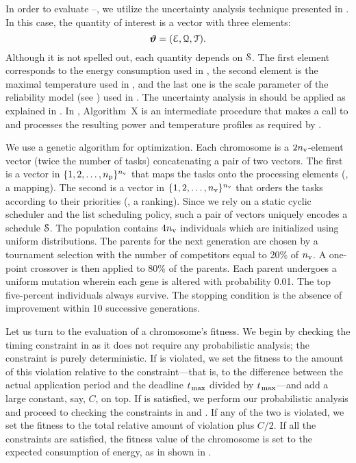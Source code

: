 In order to evaluate --, we utilize the uncertainty analysis technique presented in .
In this case, the quantity of interest is a vector with three elements:
\begin{equation} \elab{quantity-of-interest}
  \vw = (\qoiE, \qoiQ, \qoiT).
\end{equation}
Although it is not spelled out, each quantity depends on $\EuScript{S}$.
The first element corresponds to the energy consumption used in , the second element is the maximal temperature used in , and the last one is the scale parameter of the reliability model (see ) used in .
The uncertainty analysis in  should be applied as explained in .
In , Algorithm~X is an intermediate procedure that makes a call to  and processes the resulting power and temperature profiles as required by .

We use a genetic algorithm for optimization.
Each chromosome is a $2 {n_\text{v}}$-element vector (twice the number of tasks) concatenating a pair of two vectors.
The first is a vector in $\{ 1, 2, \dotsc, {n_\text{p}} \}^{n_\text{v}}$ that maps the tasks onto the processing elements (\ie, a mapping).
The second is a vector in $\{ 1, 2, \dotsc, {n_\text{v}} \}^{n_\text{v}}$ that orders the tasks according to their priorities (\ie, a ranking).
Since we rely on a static cyclic scheduler and the list scheduling policy, such a pair of vectors uniquely encodes a schedule $\EuScript{S}$.
The population contains $4 {n_\text{v}}$ individuals which are initialized using uniform distributions.
The parents for the next generation are chosen by a tournament selection with the number of competitors equal to 20\% of ${n_\text{v}}$.
A one-point crossover is then applied to 80\% of the parents.
Each parent undergoes a uniform mutation wherein each gene is altered with probability 0.01.
The top five-percent individuals always survive.
The stopping condition is the absence of improvement within 10 successive generations.

Let us turn to the evaluation of a chromosome's fitness.
We begin by checking the timing constraint in  as it does not require any probabilistic analysis; the constraint is purely deterministic.
If  is violated, we set the fitness to the amount of this violation relative to the constraint---that is, to the difference between the actual application period and the deadline $t_{\text{\kern0.1emmax}}$ divided by $t_{\text{\kern0.1emmax}}$---and add a large constant, say, $C$, on top.
If  is satisfied, we perform our probabilistic analysis and proceed to checking the constraints in  and .
If any of the two is violated, we set the fitness to the total relative amount of violation plus $C/2$.
If all the constraints are satisfied, the fitness value of the chromosome is set to the expected consumption of energy, as in shown in .

